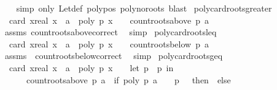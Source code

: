 \begin{isabellebody}
%
\isadelimproof
\ \ %
\endisadelimproof
%
\isatagproof
{}\isamarkupfalse%
\ {\isacharparenleft}simp\ only{\isacharcolon}\ Let{\isacharunderscore}def\ poly{\isacharunderscore}pos\ poly{\isacharunderscore}no{\isacharunderscore}roots{\isacharcomma}\ blast{\isacharparenright}%
\endisatagproof
{\isafoldproof}%
%
\isadelimproof
\isanewline
%
\endisadelimproof
\isanewline
\isanewline
{}\isamarkupfalse%
\ poly{\isacharunderscore}card{\isacharunderscore}roots{\isacharunderscore}greater{\isacharcolon}\isanewline
\ \ {\isachardoublequoteopen}card\ {\isacharbraceleft}x{\isacharcolon}{\isacharcolon}real{\isachardot}\ x\ {\isachargreater}\ a\ {\isasymand}\ poly\ p\ x\ {\isacharequal}\ {}{\isacharbraceright}\ {\isacharequal}\ count{\isacharunderscore}roots{\isacharunderscore}above\ p\ a{\isachardoublequoteclose}\isanewline
%
\isadelimproof
\ \ %
\endisadelimproof
%
\isatagproof
{}\isamarkupfalse%
\ assms\ count{\isacharunderscore}roots{\isacharunderscore}above{\isacharunderscore}correct\ \isamarkupfalse%
\ simp%
\endisatagproof
{\isafoldproof}%
%
\isadelimproof
\isanewline
%
\endisadelimproof
\isanewline
{}\isamarkupfalse%
\ poly{\isacharunderscore}card{\isacharunderscore}roots{\isacharunderscore}leq{\isacharcolon}\isanewline
\ \ {\isachardoublequoteopen}card\ {\isacharbraceleft}x{\isacharcolon}{\isacharcolon}real{\isachardot}\ x\ {\isasymle}\ a\ {\isasymand}\ poly\ p\ x\ {\isacharequal}\ {}{\isacharbraceright}\ {\isacharequal}\ count{\isacharunderscore}roots{\isacharunderscore}below\ p\ a{\isachardoublequoteclose}\isanewline
%
\isadelimproof
\ \ %
\endisadelimproof
%
\isatagproof
{}\isamarkupfalse%
\ assms\ \ count{\isacharunderscore}roots{\isacharunderscore}below{\isacharunderscore}correct\ \isamarkupfalse%
\ simp%
\endisatagproof
{\isafoldproof}%
%
\isadelimproof
\isanewline
%
\endisadelimproof
\isanewline
{}\isamarkupfalse%
\ poly{\isacharunderscore}card{\isacharunderscore}roots{\isacharunderscore}geq{\isacharcolon}\isanewline
\ \ {\isachardoublequoteopen}card\ {\isacharbraceleft}x{\isacharcolon}{\isacharcolon}real{\isachardot}\ x\ {\isasymge}\ a\ {\isasymand}\ poly\ p\ x\ {\isacharequal}\ {}{\isacharbraceright}\ {\isacharequal}\ {\isacharparenleft}let\ p\ {\isacharequal}\ p\ in\isanewline
\ \ \ \ \ \ count{\isacharunderscore}roots{\isacharunderscore}above\ p\ a\ {\isacharplus}\ {\isacharparenleft}if\ poly\ p\ a\ {\isacharequal}\ {}\ {\isasymand}\ p\ {\isasymnoteq}\ {}\ then\ {}\ else\ {}{\isacharparenright}{\isacharparenright}{\isachardoublequoteclose}\isanewline

\end{isabellebody}
